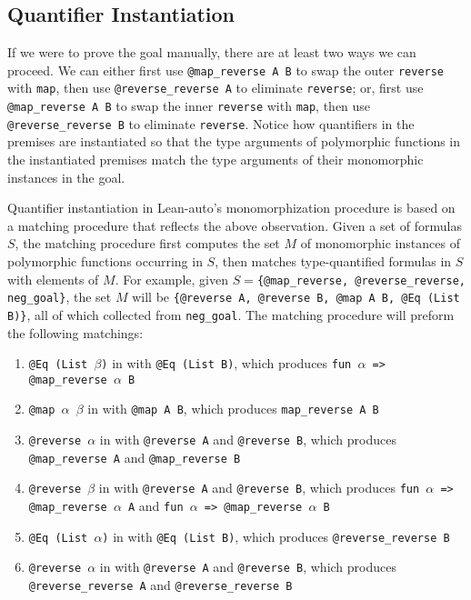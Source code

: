 \subsection{Quantifier Instantiation} \label{exinst}

If we were to prove the goal manually, there are at least two ways we can proceed. We can
either first use \texttt{@map\_reverse A B} to swap the outer \texttt{reverse} with \texttt{map}, then
use \texttt{@reverse\_reverse A} to eliminate \texttt{reverse}; or, first use
\texttt{@map\_reverse A B} to swap the inner \texttt{reverse} with \texttt{map}, then
use \texttt{@reverse\_reverse B} to eliminate \texttt{reverse}. Notice how quantifiers
in the premises are instantiated so that the type arguments of polymorphic functions
in the instantiated premises match the type arguments of their monomorphic instances in the goal.

\noindent Quantifier instantiation in Lean-auto's monomorphization procedure is based
on a matching procedure that reflects the above observation. Given a set of formulas $S$,
the matching procedure first computes the set $M$ of monomorphic instances of polymorphic functions occurring
in $S$, then matches type-quantified formulas in $S$ with elements of $M$. For example,
given $S=$\texttt{\{@map\_reverse, @reverse\_reverse, neg\_goal\}}, the set $M$ will be
\texttt{\{@reverse A, @reverse B, @map A B, @Eq (List B)\}}, all of which collected from \texttt{neg\_goal}.
The matching procedure will preform the following matchings:

\begin{enumerate}
  \item \texttt{@Eq (List $\beta$)} in \usebox{\vmaprev} with \texttt{@Eq (List B)},
    which produces \texttt{fun $\alpha$ => @map\_reverse $\alpha$ B}
  \item \texttt{@map $\alpha$ $\beta$} in \usebox{\vmaprev} with \texttt{@map A B},
    which produces \texttt{map\_reverse A B}
  \item \texttt{@reverse $\alpha$} in \usebox{\vmaprev} with \texttt{@reverse A} and \texttt{@reverse B},
    which produces \texttt{@map\_reverse A} and \texttt{@map\_reverse B}
  \item \texttt{@reverse $\beta$} in \usebox{\vmaprev} with \texttt{@reverse A} and \texttt{@reverse B},
    which produces \texttt{fun $\alpha$ => @map\_reverse $\alpha$ A} and \texttt{fun $\alpha$ => @map\_reverse $\alpha$ B}
  \item \texttt{@Eq (List $\alpha$)} in \usebox{\vrevrev} with \texttt{@Eq (List B)},
    which produces \texttt{@reverse\_reverse B}
  \item \texttt{@reverse $\alpha$} in \usebox{\vrevrev} with \texttt{@reverse A} and \texttt{@reverse B},
    which produces \texttt{@reverse\_reverse A} and \texttt{@reverse\_reverse B}
\end{enumerate}

